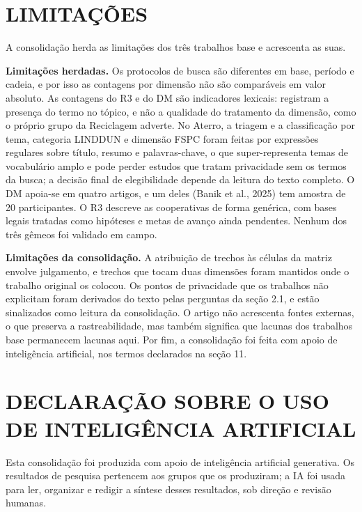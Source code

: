 \documentclass[12pt,a4paper,article,oneside,english,brazil]{abntex2}
\begin{document}
\section{LIMITAÇÕES}

A consolidação herda as limitações dos três trabalhos base e acrescenta as suas.

\textbf{Limitações herdadas.} Os protocolos de busca são diferentes em base, período e cadeia, e por isso as contagens por dimensão não são comparáveis em valor absoluto. As contagens do R3 e do DM são indicadores lexicais: registram a presença do termo no tópico, e não a qualidade do tratamento da dimensão, como o próprio grupo da Reciclagem adverte. No Aterro, a triagem e a classificação por tema, categoria LINDDUN e dimensão FSPC foram feitas por expressões regulares sobre título, resumo e palavras-chave, o que super-representa temas de vocabulário amplo e pode perder estudos que tratam privacidade sem os termos da busca; a decisão final de elegibilidade depende da leitura do texto completo. O DM apoia-se em quatro artigos, e um deles (Banik et al., 2025) tem amostra de 20 participantes. O R3 descreve as cooperativas de forma genérica, com bases legais tratadas como hipóteses e metas de avanço ainda pendentes. Nenhum dos três gêmeos foi validado em campo.

\textbf{Limitações da consolidação.} A atribuição de trechos às células da matriz envolve julgamento, e trechos que tocam duas dimensões foram mantidos onde o trabalho original os colocou. Os pontos de privacidade que os trabalhos não explicitam foram derivados do texto pelas perguntas da seção 2.1, e estão sinalizados como leitura da consolidação. O artigo não acrescenta fontes externas, o que preserva a rastreabilidade, mas também significa que lacunas dos trabalhos base permanecem lacunas aqui. Por fim, a consolidação foi feita com apoio de inteligência artificial, nos termos declarados na seção 11.

\section{DECLARAÇÃO SOBRE O USO DE INTELIGÊNCIA ARTIFICIAL}

Esta consolidação foi produzida com apoio de inteligência artificial generativa. Os resultados de pesquisa pertencem aos grupos que os produziram; a IA foi usada para ler, organizar e redigir a síntese desses resultados, sob direção e revisão humanas.
\end{document}
